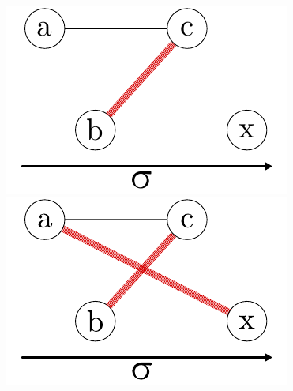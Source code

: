 \documentclass[xcolor=x11names,compress]{beamer}
\begin{document}
\begin{frame}
\begin{center}
\begin{overprint}
			\includegraphics[scale=1.0]{img/graph/p/04.pdf}
			\onslide<6>\includegraphics[scale=1.0]{img/graph/p/05.pdf}
		\end{overprint}
	\end{center}
\end{frame}
\end{document}
